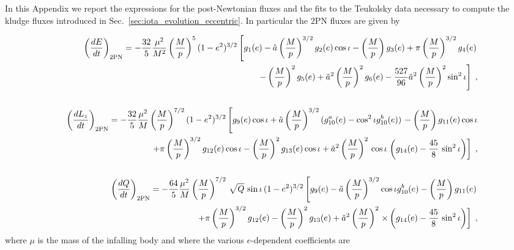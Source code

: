 \documentclass[aps,prd,twocolumn,showpacs,groupedaddress,nofootinbib]{revtex4}
\begin{document}
\appendix* 
\section{}


In this Appendix we report the expressions for the post-Newtonian
fluxes and the fits to the Teukolsky data necessary to compute the
kludge fluxes introduced in Sec.\ \ref{sec:iota_evolution_eccentric}.
In particular the $2$PN fluxes are given by~\cite{GG_kludge_fluxes}
\begin{widetext}
\begin{eqnarray}
&&\left(\frac{dE}{dt}\right)_{\rm 2PN} = 
-\frac{32}{5} \frac{\mu^2}{M^2} \left(\frac{M}{p}\right)^5 
(1-e^2)^{3/2}\left [ g_1(e) -\tilde{a}\left(\frac{M}{p}\right)^{3/2} g_2(e)
\cos\iota -\left(\frac{M}{p}\right) g_3(e) +
\pi\left(\frac{M}{p}\right)^{3/2} g_4(e)  \right.\nonumber \\
&& \hskip 2.0cm
\left. -\left(\frac{M}{p}\right)^2 g_5(e) 
+  \tilde{a}^2\left(\frac{M}{p}\right)^2 g_6(e)
-\frac{527}{96} \tilde{a}^2 \left( \frac{M}{p}\right)^2 \sin^2\iota
\right] \;, \label{Edot2PN} \\ \nonumber \\
&&\left(\frac{dL_z}{dt}\right)_{\rm 2PN} =
-\frac{32}{5} \frac{\mu^2}{M} \left(\frac{M}{p}\right)^{7/2}
(1-e^2)^{3/2}
\left [ g_9(e)\cos\iota  
+ \tilde{a}\left(\frac{M}{p}\right)^{3/2} (g_{10}^{a}(e) 
-\cos^2\iota g_{10}^{b}(e) ) \right.
-\left(\frac{M}{p}\right) g_{11}(e) \cos\iota \nonumber\\
&& \hskip 2.2cm + \pi\left(\frac{M}{p}\right)^{3/2} g_{12}(e)\cos\iota 
-\left(\frac{M}{p}\right)^2 g_{13}(e) \cos\iota  
+ \tilde{a}^2\left(\frac{M}{p}\right)^2 \,\cos\iota\left. 
\left(g_{14}(e) - \frac{45}{8}\,\sin^2\iota\right) \right
] \;,\label{Ldot2PN} \\ \nonumber \\
&&\left(\frac{dQ}{dt}\right)_{\rm 2PN} = 
-\frac{64}{5} \frac{\mu^2}{M} \left(\frac{M}{p}\right)^{7/2} 
\,\sqrt{Q}\,\sin\iota\, (1-e^2)^{3/2}
\left[ g_9(e) - \tilde{a}\left(\frac{M}{p}\right)^{3/2} 
\cos\iota g_{10}^{b}(e) -\left(\frac{M}{p}\right)
g_{11}(e)\right. \nonumber \\ 
&&\hskip 2.0cm + \pi\left(\frac{M}{p}\right)^{3/2} g_{12}(e) 
-\left(\frac{M}{p}\right)^2 g_{13}(e)
 + \tilde{a}^2\left(\frac{M}{p}\right)^2 
\left.\times\left(g_{14}(e) -
\frac{45}{8}\,\sin^2\iota\right)\right]\;, 
\label{Qdot2PN}
\end{eqnarray}
where $\mu$ is the mass of the infalling body and where the various $e$-dependent coefficients are

\end{widetext}
\end{document}
